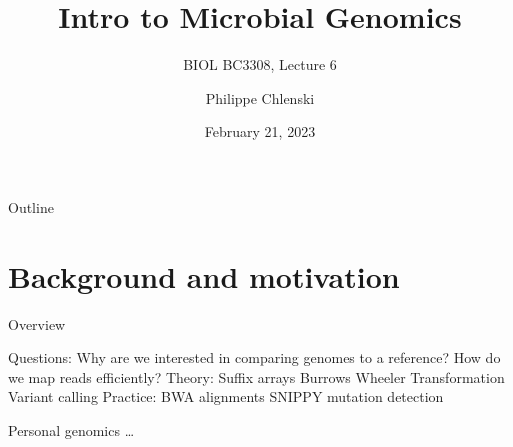 \documentclass{beamer}
\title{Intro to Microbial Genomics}
\subtitle{BIOL BC3308, Lecture 6}
\author{Philippe Chlenski}
\date{February 21, 2023}
\begin{document}
\begin{frame}[plain]
\titlepage
\end{frame}

\begin{frame}{Outline}
\tableofcontents
\end{frame}

\section{Background and motivation}

\begin{frame}{Overview}
    \begin{outline}
        \1[] Questions:
            \2 Why are we interested in comparing genomes to a reference?
            \2 How do we map reads efficiently?
        \1[] Theory:
            \2 Suffix arrays
            \2 Burrows Wheeler Transformation
            \2 Variant calling
        \1[] Practice:
            \2 BWA alignments
            \2 SNIPPY mutation detection
    \end{outline}
\end{frame}

\begin{frame}{Personal genomics}
    \ldots
\end{frame}

\section{}
\end{document}
